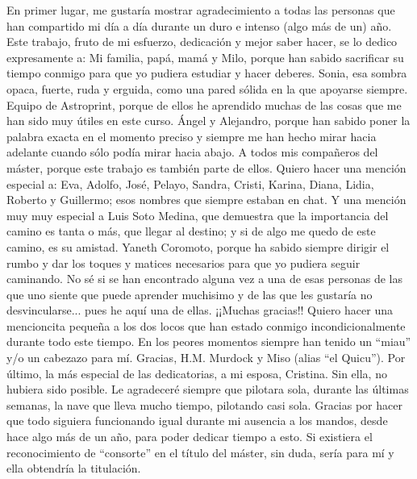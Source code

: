 
\cleardoublepage

\vspace{15ex}


En primer lugar, me gustaría mostrar agradecimiento a todas las personas que han compartido mi día a día durante un duro e intenso (algo más de un) año.
\newline
Este trabajo, fruto de mi esfuerzo, dedicación y mejor saber hacer, se lo dedico expresamente a:
\newline
Mi familia, papá, mamá y Milo, porque han sabido sacrificar su tiempo conmigo para que yo pudiera estudiar y hacer deberes.
\newline
Sonia, esa sombra opaca, fuerte, ruda y erguida, como una pared sólida en la que apoyarse siempre.
\newline
Equipo de Astroprint, porque de ellos he aprendido muchas de las cosas que me han sido muy útiles en este curso.
\newline
Ángel y Alejandro, porque han sabido poner la palabra exacta en el momento preciso y siempre me han hecho mirar hacia adelante cuando sólo podía mirar hacia abajo.
\newline
A todos mis compañeros del máster, porque este trabajo es también parte de ellos.
Quiero hacer una mención especial a: Eva, Adolfo, José, Pelayo, Sandra, Cristi, Karina, Diana, Lidia, Roberto y Guillermo; esos nombres que siempre estaban en chat.
Y una mención muy muy especial a Luis Soto Medina, que demuestra que la importancia del camino es tanta o más, que llegar al destino; y si de algo me quedo de este camino, es su amistad.
\newline
Yaneth Coromoto, porque ha sabido siempre dirigir el rumbo y dar los toques y matices necesarios para que yo pudiera seguir caminando. No sé si se han encontrado alguna vez a una de esas personas de las que uno siente que puede aprender muchisimo y de las que les gustaría no desvincularse... pues he aquí una de ellas. ¡¡Muchas gracias!!
\newline
\newline
Quiero hacer una mencioncita pequeña a los dos locos que han estado conmigo incondicionalmente durante todo este tiempo. En los peores momentos siempre han tenido un ``miau'' y/o un cabezazo para mí. Gracias, H.M. Murdock y Miso (alias ``el Quicu'').
\newline
\newline
Por último, la más especial de las dedicatorias, a mi esposa, Cristina. Sin ella, no hubiera sido posible. Le agradeceré siempre que pilotara sola, durante las últimas semanas, la nave que lleva mucho tiempo, pilotando casi sola. Gracias por hacer que todo siguiera funcionando igual durante mi ausencia a los mandos, desde hace algo más de un año, para poder dedicar tiempo a esto. Si existiera el reconocimiento de ``consorte'' en el título del máster, sin duda, sería para mí y ella obtendría la titulación.
